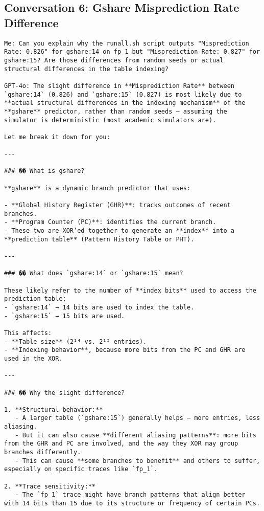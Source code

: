 \documentclass[11pt]{article}
\begin{document}
\subsection{Conversation 6: Gshare Misprediction Rate Difference}
\begin{Verbatim}[fontsize=\tiny, breaklines=true]
Me: Can you explain why the runall.sh script outputs "Misprediction Rate: 0.826" for gshare:14 on fp_1 but "Misprediction Rate: 0.827" for gshare:15? Are those differences from random seeds or actual structural differences in the table indexing?

GPT-4o: The slight difference in **Misprediction Rate** between `gshare:14` (0.826) and `gshare:15` (0.827) is most likely due to **actual structural differences in the indexing mechanism** of the **gshare** predictor, rather than random seeds — assuming the simulator is deterministic (most academic simulators are).

Let me break it down for you:

---

### �� What is gshare?

**gshare** is a dynamic branch predictor that uses:

- **Global History Register (GHR)**: tracks outcomes of recent branches.
- **Program Counter (PC)**: identifies the current branch.
- These two are XOR’ed together to generate an **index** into a **prediction table** (Pattern History Table or PHT).

---

### �� What does `gshare:14` or `gshare:15` mean?

These likely refer to the number of **index bits** used to access the prediction table:
- `gshare:14` → 14 bits are used to index the table.
- `gshare:15` → 15 bits are used.

This affects:
- **Table size** (2¹⁴ vs. 2¹⁵ entries).
- **Indexing behavior**, because more bits from the PC and GHR are used in the XOR.

---

### �� Why the slight difference?

1. **Structural behavior:**
   - A larger table (`gshare:15`) generally helps — more entries, less aliasing.
   - But it can also cause **different aliasing patterns**: more bits from the GHR and PC are involved, and the way they XOR may group branches differently.
   - This can cause **some branches to benefit** and others to suffer, especially on specific traces like `fp_1`.

2. **Trace sensitivity:**
   - The `fp_1` trace might have branch patterns that align better with 14 bits than 15 due to its structure or frequency of certain PCs.


\end{Verbatim}
\end{document}

